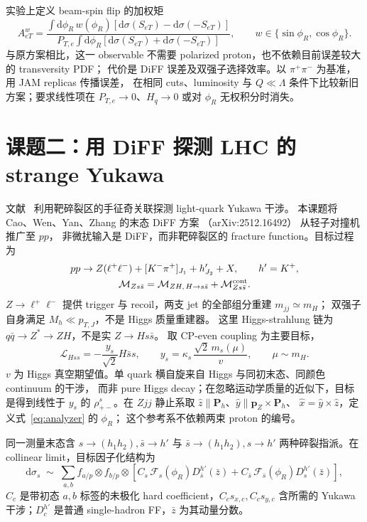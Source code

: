 \documentclass[UTF8,a4paper,zihao=-4,fontset=fandol]{ctexart}
\newcommand{\dd}{\mathrm d}
\begin{document}
实验上定义 beam-spin flip 的加权矩
\[
 A_{eT}^{w}=
 \frac{\int \dd\phi_R\,w(\phi_R)
 [\dd\sigma(S_{eT})-\dd\sigma(-S_{eT})]}
 {P_{T,e}\int \dd\phi_R
 [\dd\sigma(S_{eT})+\dd\sigma(-S_{eT})]},
 \qquad w\in\{\sin\phi_R,\cos\phi_R\}.
\]
与原方案相比，这一 observable 不需要 polarized proton，也不依赖目前误差较大的 transversity PDF；
代价是 DiFF 误差及双强子选择效率。以 \(\pi^+\pi^-\) 为基准，用 JAM replicas 传播误差，
在相同 cuts、luminosity 与 \(Q\ll\Lambda\) 条件下比较新旧方案；要求线性项在
\(P_{T,e}\to0\)、\(H_q\to0\) 或对 \(\phi_R\) 无权积分时消失。

\section{课题二：用 DiFF 探测 LHC 的 strange Yukawa}

文献~\cite{Michel:2025afc} 利用靶碎裂区的手征奇关联探测 light-quark Yukawa 干涉。
本课题将 Cao、Wen、Yan、Zhang 的末态 DiFF 方案
（arXiv:2512.16492）\cite{Cao:2025wfg} 从轻子对撞机推广至 \(pp\)，
非微扰输入是 DiFF，而非靶碎裂区的 fracture function。目标过程为
\[
 \begin{gathered}
 pp\to Z(\ell^+\ell^-)+[K^-\pi^+]_{J_1}+h'_{J_2}+X,\qquad h'=K^+,\\
 \mathcal M_{Zs\bar s}=\mathcal M_{ZH,\,H\to s\bar s}
 +\mathcal M^{\rm cont}_{Zs\bar s}.
 \end{gathered}
\]
\(Z\to\ell^+\ell^-\) 提供 trigger 与 recoil，两支 jet 的全部组分重建 \(m_{jj}\simeq m_H\)；
双强子自身满足 \(M_h\ll p_{T,J}\)，不是 Higgs 质量重建器。
这里 Higgs-strahlung 链为 \(q\bar q\to Z^*\to ZH\)，不是实 \(Z\to Hs\bar s\)。
取 CP-even coupling 为主要目标，
\[
 \mathcal L_{Hss}=-\frac{y_s}{\sqrt2}H\bar ss,
 \qquad y_s=\kappa_s\,\frac{\sqrt2\,m_s(\mu)}{v},\qquad \mu\sim m_H.
\]
\(v\) 为 Higgs 真空期望值。单 quark 横自旋来自 Higgs 与同初末态、同颜色 continuum 的干涉，
而非 pure Higgs decay；在忽略运动学质量的近似下，目标是得到线性于 \(y_s\) 的
\(\rho_{+-}^{s}\)。在 \(Zjj\) 静止系取
\(\hat z\parallel\bm P_h\)、\(\hat y\parallel\bm p_Z\times\bm P_h\)、
\(\hat x=\hat y\times\hat z\)，定义式~\eqref{eq:analyzer} 的 \(\phi_R\)；
这个参考系不依赖两束 proton 的编号。

同一测量末态含 \(s\to(h_1h_2),\bar s\to h'\) 与
\(\bar s\to(h_1h_2),s\to h'\) 两种碎裂指派。在 collinear limit，目标因子化结构为
\[
 \dd\sigma_s\;\sim\;\sum_{a,b} f_{a/p}\otimes f_{b/p}\otimes
 \left[
 C_s\,\mathcal F_s(\phi_R)D_{\bar s}^{h'}(\bar z)
 +C_{\bar s}\,\mathcal F_{\bar s}(\phi_R)D_s^{h'}(\bar z)
 \right],
\]
\(C_c\) 是带初态 \(a,b\) 标签的未极化 hard coefficient，\(C_c s_{x,c},C_c s_{y,c}\)
含所需的 Yukawa 干涉；\(D_c^{h'}\) 是普通 single-hadron FF，\(\bar z\) 为其动量分数。
\end{document}
